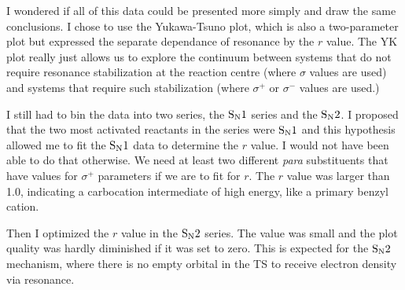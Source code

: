 \documentclass{tufte-handout}
\begin{document}
I wondered if all of this data could be presented more simply and draw the same conclusions. I chose to use the Yukawa-Tsuno plot, which is also a two-parameter plot but expressed the separate dependance of resonance by the $r$ value. The YK plot really just allows us to explore the continuum between systems that do not require resonance stabilization at the reaction centre (where $\sigma$ values are used) and systems that require such stabilization (where $\sigma^+$ or $\sigma^-$ values are used.) 

I still had to bin the data into two series, the $\rm S_N1$ series and the $\rm S_N2$. I proposed that the two most activated reactants in the  series were $\rm S_N1$ and this hypothesis allowed me to fit the $\rm S_N1$ data to determine the $r$ value. I would not have been able to do that otherwise. We need at least two different \textit{para} substituents that have values for $\sigma^+$ parameters if we are to fit for $r$. The $r$ value was larger than 1.0, indicating a carbocation intermediate of high energy, like a primary benzyl cation.

Then I optimized the $r$ value in the $\rm S_N2$ series. The value was small and the plot quality was hardly diminished if it was set to zero. This is expected for the $\rm S_N2$ mechanism, where there is no empty orbital in the TS to receive electron density via resonance.
\end{document}
